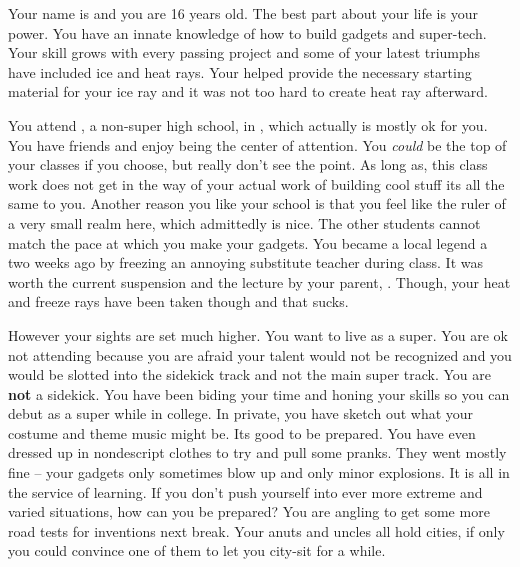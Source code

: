 \documentclass[char]{LRSguildcamp1}
\begin{document}
\name{\cTeen{}}



Your name is \cTeen{\intro} and you are 16 years old. The best part about your life is your power. You have an innate knowledge of how to build gadgets and super-tech. Your skill grows with every passing project and some of your latest triumphs have included ice and heat rays. Your \cOldest{\uncle} helped provide the necessary starting material for your ice ray and it was not too hard to create heat ray afterward. 

You attend \pNormalSchool{}, a non-super high school, in \pCityArchitect{}, which actually is mostly ok for you. You have friends and enjoy being the center of attention. You \textsl{could} be the top of your classes if you choose, but really don't see the point. As long as, this class work does not get in the way of your actual work of building cool stuff its all the same to you. Another reason you like your school is that you feel like the ruler of a very small realm here, which admittedly is nice. The other students cannot match the pace at which you make your gadgets. You became a local legend a two weeks ago by freezing an annoying substitute teacher during class. It was worth the current suspension and the lecture by your parent, \cArchitect{}. Though, your heat and freeze rays have been taken though and that sucks. 

However your sights are set much higher. You want to live as a super. You are ok not attending \pSuperSchool{} because you are afraid your talent would not be recognized and you would be slotted into the sidekick track and not the main super track. You are \textbf{not} a sidekick. You have been biding your time and honing your skills so you can debut as a super while in college. In private, you have sketch out what your costume and theme music might be. Its good to be prepared. You have even dressed up in nondescript clothes to try and pull some pranks.  They went mostly fine -- your gadgets only sometimes blow up and only minor explosions. It is all in the service of learning. If you don't push yourself into ever more extreme and varied situations, how can you be prepared? You are angling to get some more road tests for inventions next break. Your anuts and uncles all hold cities, if only you could convince one of them to let you city-sit for a while.
\end{document}
